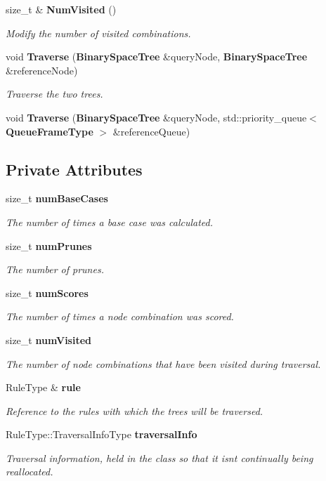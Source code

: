 \begin{DoxyCompactItemize}
size\+\_\+t \& {\bf Num\+Visited} ()
\begin{DoxyCompactList}\small\item\em Modify the number of visited combinations. \end{DoxyCompactList}\item 
void {\bf Traverse} ({\bf Binary\+Space\+Tree} \&query\+Node, {\bf Binary\+Space\+Tree} \&reference\+Node)
\begin{DoxyCompactList}\small\item\em Traverse the two trees. \end{DoxyCompactList}\item 
void {\bf Traverse} ({\bf Binary\+Space\+Tree} \&query\+Node, std\+::priority\+\_\+queue$<$ {\bf Queue\+Frame\+Type} $>$ \&reference\+Queue)
\end{DoxyCompactItemize}
\subsection*{Private Attributes}
\begin{DoxyCompactItemize}
\item 
size\+\_\+t {\bf num\+Base\+Cases}
\begin{DoxyCompactList}\small\item\em The number of times a base case was calculated. \end{DoxyCompactList}\item 
size\+\_\+t {\bf num\+Prunes}
\begin{DoxyCompactList}\small\item\em The number of prunes. \end{DoxyCompactList}\item 
size\+\_\+t {\bf num\+Scores}
\begin{DoxyCompactList}\small\item\em The number of times a node combination was scored. \end{DoxyCompactList}\item 
size\+\_\+t {\bf num\+Visited}
\begin{DoxyCompactList}\small\item\em The number of node combinations that have been visited during traversal. \end{DoxyCompactList}\item 
Rule\+Type \& {\bf rule}
\begin{DoxyCompactList}\small\item\em Reference to the rules with which the trees will be traversed. \end{DoxyCompactList}\item 
Rule\+Type\+::\+Traversal\+Info\+Type {\bf traversal\+Info}
\begin{DoxyCompactList}\small\item\em Traversal information, held in the class so that it isn\textquotesingle{}t continually being reallocated. \end{DoxyCompactList}\end{DoxyCompactItemize}


